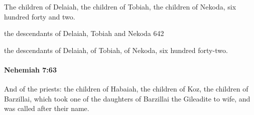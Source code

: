 			\begin{versebox}
					\item[BHS] 
					\item[LXX] 
					\item[ASV] The children of Delaiah, the children of Tobiah, the children of Nekoda, six hundred forty and two.
					\item[NIV] the descendants of Delaiah, Tobiah and Nekoda 642
					\item[NRSV] the descendants of Delaiah, of Tobiah, of Nekoda, six hundred forty-two.
			\end{versebox}

		\paragraph{Nehemiah 7:63} %
			\label{NEHEMIAH-7-63}

			And of the priests: the children of Habaiah, the children of Koz, the children of Barzillai, which took one of the daughters of Barzillai the Gileadite to wife, and was called after their name.

